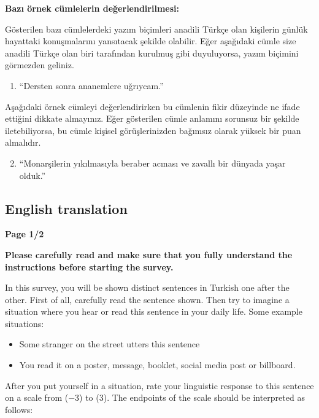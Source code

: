 \textbf{Bazı örnek cümlelerin değerlendirilmesi:}


Gösterilen bazı cümlelerdeki yazım biçimleri anadili Türkçe olan kişilerin günlük hayattaki konuşmalarını yansıtacak şekilde olabilir. Eğer aşağıdaki cümle size anadili Türkçe olan biri tarafından kurulmuş gibi duyuluyorsa, yazım biçimini görmezden geliniz.

\begin{enumerate}
	\item ``Dersten sonra ananemlere uğrıycam.''
\end{enumerate}


Aşağıdaki örnek cümleyi değerlendirirken bu cümlenin fikir düzeyinde ne ifade ettiğini dikkate almayınız. Eğer gösterilen cümle anlamını sorunsuz bir şekilde iletebiliyorsa, bu cümle kişisel görüşlerinizden bağımsız olarak yüksek bir puan almalıdır.


\begin{enumerate}
	\setcounter{enumi}{1}
	\item ``Monarşilerin yıkılmasıyla beraber acınası ve zavallı bir dünyada yaşar olduk.''
\end{enumerate}



\subsection{English translation}

\begin{center}
	\large \textbf{Page 1/2}
\end{center}

\textbf{Please carefully read and make sure that you fully understand the instructions before starting the survey.}

In this survey, you will be shown distinct sentences in Turkish one after the other. First of all, carefully read the sentence shown. Then try to imagine a situation where you hear or read this sentence in your daily life. Some example situations:

\begin{itemize}
	\item Some stranger on the street utters this sentence
	\item You read it on a poster, message, booklet, social media post or billboard.
\end{itemize}

After you put yourself in a situation, rate your linguistic response to this sentence on a scale from ($-$3) to (3). The endpoints of the scale should be interpreted as follows:

